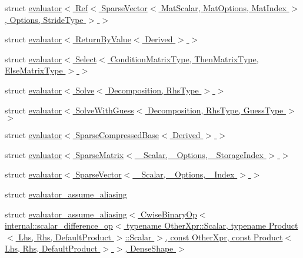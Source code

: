 \begin{DoxyCompactItemize}
\item 
struct \hyperlink{struct_eigen_1_1internal_1_1evaluator_3_01_ref_3_01_sparse_vector_3_01_mat_scalar_00_01_mat_optic924bcdf873ee6e467b0642118d17ceb}{evaluator$<$ Ref$<$ Sparse\+Vector$<$ Mat\+Scalar, Mat\+Options, Mat\+Index $>$, Options, Stride\+Type $>$ $>$}
\item 
struct \hyperlink{struct_eigen_1_1internal_1_1evaluator_3_01_return_by_value_3_01_derived_01_4_01_4}{evaluator$<$ Return\+By\+Value$<$ Derived $>$ $>$}
\item 
struct \hyperlink{struct_eigen_1_1internal_1_1evaluator_3_01_select_3_01_condition_matrix_type_00_01_then_matrix_t0c555ecce04e199df0b1ebada3749ccc}{evaluator$<$ Select$<$ Condition\+Matrix\+Type, Then\+Matrix\+Type, Else\+Matrix\+Type $>$ $>$}
\item 
struct \hyperlink{struct_eigen_1_1internal_1_1evaluator_3_01_solve_3_01_decomposition_00_01_rhs_type_01_4_01_4}{evaluator$<$ Solve$<$ Decomposition, Rhs\+Type $>$ $>$}
\item 
struct \hyperlink{struct_eigen_1_1internal_1_1evaluator_3_01_solve_with_guess_3_01_decomposition_00_01_rhs_type_00_01_guess_type_01_4_01_4}{evaluator$<$ Solve\+With\+Guess$<$ Decomposition, Rhs\+Type, Guess\+Type $>$ $>$}
\item 
struct \hyperlink{struct_eigen_1_1internal_1_1evaluator_3_01_sparse_compressed_base_3_01_derived_01_4_01_4}{evaluator$<$ Sparse\+Compressed\+Base$<$ Derived $>$ $>$}
\item 
struct \hyperlink{struct_eigen_1_1internal_1_1evaluator_3_01_sparse_matrix_3_01___scalar_00_01___options_00_01___storage_index_01_4_01_4}{evaluator$<$ Sparse\+Matrix$<$ \+\_\+\+Scalar, \+\_\+\+Options, \+\_\+\+Storage\+Index $>$ $>$}
\item 
struct \hyperlink{struct_eigen_1_1internal_1_1evaluator_3_01_sparse_vector_3_01___scalar_00_01___options_00_01___index_01_4_01_4}{evaluator$<$ Sparse\+Vector$<$ \+\_\+\+Scalar, \+\_\+\+Options, \+\_\+\+Index $>$ $>$}
\item 
struct \hyperlink{struct_eigen_1_1internal_1_1evaluator__assume__aliasing}{evaluator\+\_\+assume\+\_\+aliasing}
\item 
struct \hyperlink{struct_eigen_1_1internal_1_1evaluator__assume__aliasing_3_01_cwise_binary_op_3_01internal_1_1sca69efad99c33943cb3731d094798b855b}{evaluator\+\_\+assume\+\_\+aliasing$<$ Cwise\+Binary\+Op$<$ internal\+::scalar\+\_\+difference\+\_\+op$<$ typename Other\+Xpr\+::\+Scalar, typename Product$<$ Lhs, Rhs, Default\+Product $>$\+::\+Scalar $>$, const Other\+Xpr, const Product$<$ Lhs, Rhs, Default\+Product $>$ $>$, Dense\+Shape $>$}

\end{DoxyCompactItemize}
